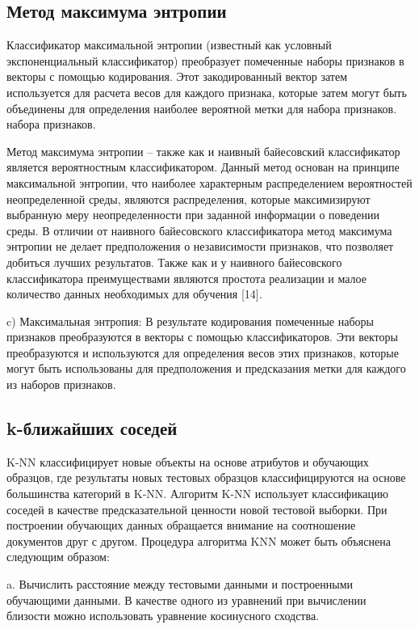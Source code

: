 \subsection{Метод максимума энтропии}

Классификатор максимальной энтропии (известный как условный экспоненциальный
классификатор) преобразует помеченные наборы признаков в векторы с помощью
кодирования. Этот закодированный вектор затем используется для расчета весов для
каждого признака, которые затем могут быть объединены для определения наиболее
вероятной метки для набора признаков. набора признаков.~\cite{article4}

Метод максимума энтропии – также как и наивный байесовский классификатор
является вероятностным классификатором. Данный метод основан на принципе
максимальной энтропии, что наиболее характерным распределением вероятностей
неопределенной среды, являются распределения, которые максимизируют выбранную
меру неопределенности при заданной информации о поведении среды. В отличии от
наивного байесовского классификатора метод максимума энтропии не делает
предположения о независимости признаков, что позволяет добиться лучших
результатов. Также как и у наивного байесовского классификатора преимуществами
являются простота реализации и малое количество данных необходимых для обучения
[14].~\cite{article9}

c) Максимальная энтропия: В результате кодирования помеченные наборы признаков
преобразуются в векторы с помощью классификаторов. Эти векторы преобразуются и
используются для определения весов этих признаков, которые могут быть
использованы для предположения и предсказания метки для каждого из наборов
признаков.~\cite{article18}

\subsection{k-ближайших соседей}

K-NN классифицирует новые объекты на основе атрибутов и обучающих образцов, где
результаты новых тестовых образцов классифицируются на основе большинства
категорий в K-NN. Алгоритм K-NN использует классификацию соседей в качестве
предсказательной ценности новой тестовой выборки.  При построении обучающих
данных обращается внимание на соотношение документов друг с другом.  Процедура
алгоритма KNN может быть объяснена следующим образом:

a. Вычислить расстояние между тестовыми данными и построенными обучающими
данными.  В качестве одного из уравнений при вычислении близости можно
использовать уравнение косинусного сходства.

